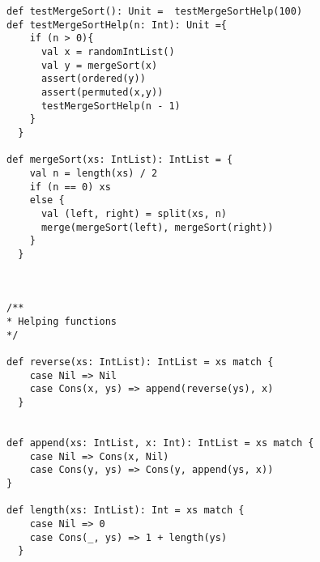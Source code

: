 \documentclass[a4paper, 10pt]{article}
\begin{document}
\begin{lstlisting}
def testMergeSort(): Unit =  testMergeSortHelp(100)
def testMergeSortHelp(n: Int): Unit ={
    if (n > 0){
      val x = randomIntList()
      val y = mergeSort(x)
      assert(ordered(y))
      assert(permuted(x,y))
      testMergeSortHelp(n - 1)
    }
  }
  
def mergeSort(xs: IntList): IntList = {
    val n = length(xs) / 2
    if (n == 0) xs
    else {
      val (left, right) = split(xs, n)
      merge(mergeSort(left), mergeSort(right))
    }
  }
  
  
  
/**
* Helping functions
*/
  
def reverse(xs: IntList): IntList = xs match {
    case Nil => Nil
    case Cons(x, ys) => append(reverse(ys), x)
  }
  
  
def append(xs: IntList, x: Int): IntList = xs match {
    case Nil => Cons(x, Nil)
    case Cons(y, ys) => Cons(y, append(ys, x))
}

def length(xs: IntList): Int = xs match {
    case Nil => 0
    case Cons(_, ys) => 1 + length(ys)
  }

\end{lstlisting}
\end{document}
